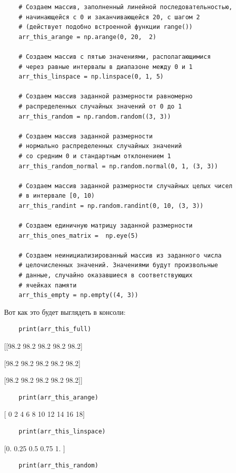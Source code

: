 \documentclass[pract]{SCWorks}
\begin{document}
\begin{itemize}
\begin{verbatim}
    # Cоздаем массив, заполненный линейной последовательностью,
    # начинающейся с 0 и заканчивающейся 20, с шагом 2
    # (действует подобно встроенной функции range())
    arr_this_arange = np.arange(0, 20,  2)

    # Создаем массив с пятью значениями, располагающимися
    # через равные интервалы в диапазоне между 0 и 1
    arr_this_linspace = np.linspace(0, 1, 5)

    # Создаем массив заданной размерности равномерно
    # распределенных случайных значений от 0 до 1
    arr_this_random = np.random.random((3, 3))

    # Создаем массив заданной размерности
    # нормально распределенных случайных значений
    # со средним 0 и стандартным отклонением 1
    arr_this_random_normal = np.random.normal(0, 1, (3, 3))

    # Создаем массив заданной размерности случайных целых чисел
    # в интервале [0, 10)
    arr_this_randint = np.random.randint(0, 10, (3, 3))

    # Создаем единичную матрицу заданной размерности
    arr_this_ones_matrix =  np.eye(5)

    # Создаем неинициализированный массив из заданного числа
    # целочисленных значений. Значениями будут произвольные
    # данные, случайно оказавшиеся в соответствующих 
    # ячейках памяти
    arr_this_empty = np.empty((4, 3))
    \end{verbatim}

    Вот как это будет выглядеть в консоли:

    \begin{verbatim}
    print(arr_this_full)
    \end{verbatim}

    [[98.2 98.2 98.2 98.2 98.2]
    
    [98.2 98.2 98.2 98.2 98.2]
    
    [98.2 98.2 98.2 98.2 98.2]]

    \begin{verbatim}
    print(arr_this_arange)
    \end{verbatim}

    [ 0  2  4  6  8 10 12 14 16 18]

    \begin{verbatim}
    print(arr_this_linspace)
    \end{verbatim}

    [0.   0.25 0.5  0.75 1.  ]

    \begin{verbatim}
    print(arr_this_random)
    \end{verbatim}


\end{itemize}
\end{document}
